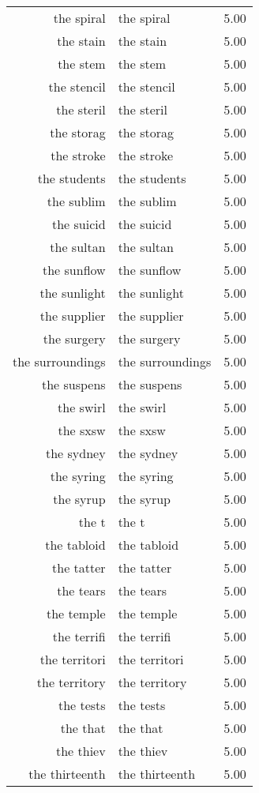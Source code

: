 \begin{table}[ht]
\begin{tabular}{rlr}
  the spiral & the spiral & 5.00 \\ 
  the stain & the stain & 5.00 \\ 
  the stem & the stem & 5.00 \\ 
  the stencil & the stencil & 5.00 \\ 
  the steril & the steril & 5.00 \\ 
  the storag & the storag & 5.00 \\ 
  the stroke & the stroke & 5.00 \\ 
  the students & the students & 5.00 \\ 
  the sublim & the sublim & 5.00 \\ 
  the suicid & the suicid & 5.00 \\ 
  the sultan & the sultan & 5.00 \\ 
  the sunflow & the sunflow & 5.00 \\ 
  the sunlight & the sunlight & 5.00 \\ 
  the supplier & the supplier & 5.00 \\ 
  the surgery & the surgery & 5.00 \\ 
  the surroundings & the surroundings & 5.00 \\ 
  the suspens & the suspens & 5.00 \\ 
  the swirl & the swirl & 5.00 \\ 
  the sxsw & the sxsw & 5.00 \\ 
  the sydney & the sydney & 5.00 \\ 
  the syring & the syring & 5.00 \\ 
  the syrup & the syrup & 5.00 \\ 
  the t & the t & 5.00 \\ 
  the tabloid & the tabloid & 5.00 \\ 
  the tatter & the tatter & 5.00 \\ 
  the tears & the tears & 5.00 \\ 
  the temple & the temple & 5.00 \\ 
  the terrifi & the terrifi & 5.00 \\ 
  the territori & the territori & 5.00 \\ 
  the territory & the territory & 5.00 \\ 
  the tests & the tests & 5.00 \\ 
  the that & the that & 5.00 \\ 
  the thiev & the thiev & 5.00 \\ 
  the thirteenth & the thirteenth & 5.00 \\ 

\end{tabular}
\end{table}
